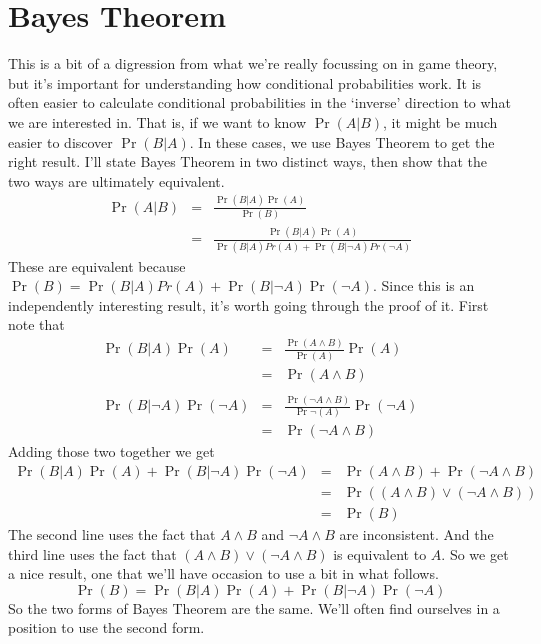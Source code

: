 \documentclass[openany]{book}
\begin{document}
\section{Bayes Theorem}
This is a bit of a digression from what we're really focussing on in game theory, but it's important for understanding how conditional probabilities work. It is often easier to calculate conditional probabilities in the `inverse' direction to what we are interested in. That is, if we want to know $\Pr(A | B)$, it might be much easier to discover $\Pr(B | A)$. In these cases, we use Bayes Theorem to get the right result. I'll state Bayes Theorem in two distinct ways, then show that the two ways are ultimately equivalent.
\begin{eqnarray*}
\Pr(A|B) &=& \frac{\Pr(B|A) \Pr(A)}{\Pr(B)} \\
&=& \frac{\Pr(B|A) \Pr(A)}{\Pr(B|A)Pr(A) + \Pr(B|\neg A)Pr(\neg A)}
\end{eqnarray*}
These are equivalent because $\Pr(B) = \Pr(B|A)Pr(A) + \Pr(B|\neg A)\Pr(\neg A)$. Since this is an independently interesting result, it's worth going through the proof of it. First note that
\begin{eqnarray*}
\Pr(B|A)\Pr(A) &=& \frac{\Pr(A \wedge B)}{\Pr(A)} \Pr(A) \\
&=& \Pr(A \wedge B) \\
\\
\Pr(B|\neg A)\Pr(\neg A) &=& \frac{\Pr(\neg A \wedge B)}{\Pr\neg (A)} \Pr(\neg A) \\
&=& \Pr(\neg A \wedge B)
\end{eqnarray*} Adding those two together we get
\begin{eqnarray*}
\Pr(B|A)\Pr(A) + \Pr(B|\neg A)\Pr(\neg A) &=& \Pr(A \wedge B) + \Pr(\neg A \wedge B) \\
&=& \Pr((A \wedge B) \vee (\neg A \wedge B)) \\
&=& \Pr(B)
\end{eqnarray*} 
The second line uses the fact that $A \wedge B$ and $\neg A \wedge B$ are inconsistent. And the third line uses the fact that $(A \wedge B) \vee (\neg A \wedge B)$ is equivalent to $A$. So we get a nice result, one that we'll have occasion to use a bit in what follows.
\begin{equation*}
\Pr(B) = \Pr(B|A)\Pr(A) + \Pr(B|\neg A)\Pr(\neg A)
\end{equation*} So the two forms of Bayes Theorem are the same. We'll often find ourselves in a position to use the second form. 
\end{document}
